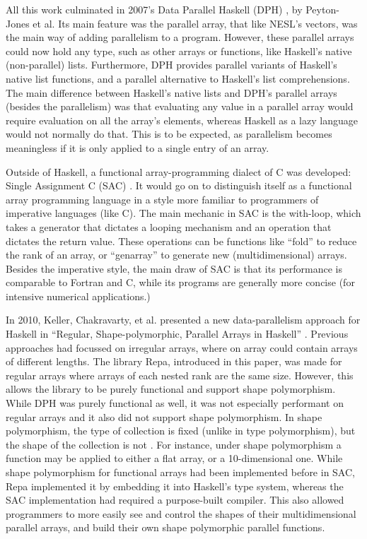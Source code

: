         All this work culminated in 2007's Data Parallel Haskell (DPH) \cite{peyton2008harnessing}, by Peyton-Jones et al.
        Its main feature was the parallel array, that like NESL's vectors, was the main way of adding parallelism to a program.
        However, these parallel arrays could now hold any type, such as other arrays or functions, like Haskell's native (non-parallel) lists.
        Furthermore, DPH provides parallel variants of Haskell's native list functions, and a parallel alternative to Haskell's list comprehensions.
        The main difference between Haskell's native lists and DPH's parallel arrays (besides the parallelism) was that evaluating any value in a parallel array would require evaluation on all the array's elements, whereas Haskell as a lazy language would not normally do that.
        This is to be expected, as parallelism becomes meaningless if it is only applied to a single entry of an array.

        Outside of Haskell, a functional array-programming dialect of C was developed: Single Assignment C (SAC) \cite{scholz1994single, scholz2003single, grelck2005generic}.
        It would go on to distinguish itself as a functional array programming language in a style more familiar to programmers of imperative languages (like C).
        The main mechanic in SAC is the with-loop, which takes a generator that dictates a looping mechanism and an operation that dictates the return value.
        These operations can be functions like ``fold'' to reduce the rank of an array, or ``genarray'' to generate new (multidimensional) arrays.
        Besides the imperative style, the main draw of SAC is that its performance is comparable to Fortran and C, while its programs are generally more concise (for intensive numerical applications.)

        In 2010, Keller, Chakravarty, et al. presented a new data-parallelism approach for Haskell in ``Regular, Shape-polymorphic, Parallel Arrays in Haskell'' \cite{keller2010regular}.
        Previous approaches had focussed on irregular arrays, where on array could contain arrays of different lengths.
        The library Repa, introduced in this paper, was made for regular arrays where arrays of each nested rank are the same size.
        However, this allows the library to be purely functional and support shape polymorphism.
        While DPH was purely functional as well, it was not especially performant on regular arrays and it also did not support shape polymorphism.
        In shape polymorphism, the type of collection is fixed (unlike in type polymorphism), but the shape of the collection is not \cite{jay1994shapely}.
        For instance, under shape polymorphism a function may be applied to either a flat array, or a 10-dimensional one.
        While shape polymorphism for functional arrays had been implemented before in SAC, Repa implemented it by embedding it into Haskell's type system, whereas the SAC implementation had required a purpose-built compiler.
        This also allowed programmers to more easily see and control the shapes of their multidimensional parallel arrays, and build their own shape polymorphic parallel functions.

